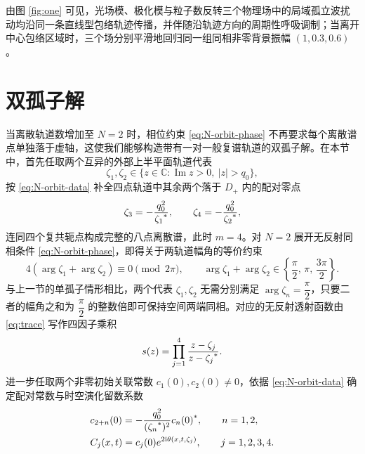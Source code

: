 由图 \ref{fig:one} 可见，光场模、极化模与粒子数反转三个物理场中的局域孤立波扰动均沿同一条直线型包络轨迹传播，并伴随沿轨迹方向的周期性呼吸调制；当离开中心包络区域时，三个场分别平滑地回归同一组同相非零背景振幅 $\left(1,0.3,0.6\right)$。

\section{双孤子解}

当离散轨道数增加至 $N=2$ 时，相位约束 \eqref{eq:N-orbit-phase} 不再要求每个离散谱点单独落于虚轴，这使我们能够构造带有一对一般复谱轨道的双孤子解。在本节中，首先任取两个互异的外部上半平面轨道代表
\begin{equation}\label{eq:two-orbit-reps}
\zeta_1,\zeta_2\in\{z\in\mathbb C:\operatorname{Im}z>0,\ |z|>q_0\},
\end{equation}
按 \eqref{eq:N-orbit-data} 补全四点轨道中其余两个落于 $D_+$ 内的配对零点
\begin{equation}\label{eq:two-orbit-partners}
\zeta_3=-\dfrac{q_0^2}{{\zeta_1}^{*}},\qquad
\zeta_4=-\dfrac{q_0^2}{{\zeta_2}^{*}},
\end{equation}
连同四个复共轭点构成完整的八点离散谱，此时 $m=4$。对 $N=2$ 展开无反射同相条件 \eqref{eq:N-orbit-phase}，即得关于两轨道幅角的等价约束
\begin{equation}\label{eq:two-orbit-phase}
4(\arg\zeta_1+\arg\zeta_2)\equiv0\pmod{2\pi},\qquad
\arg\zeta_1+\arg\zeta_2\in\left\{\dfrac{\pi}{2},\,\pi,\,\dfrac{3\pi}{2}\right\}.
\end{equation}
与上一节的单孤子情形相比，两个代表 $\zeta_1,\zeta_2$ 无需分别满足 $\arg\zeta_n=\dfrac{\pi}{2}$，只要二者的幅角之和为 $\dfrac{\pi}{2}$ 的整数倍即可保持空间两端同相。对应的无反射透射函数由 \eqref{eq:trace} 写作四因子乘积
\begin{equation}\label{eq:two-orbit-s}
s(z)=\prod\limits_{j=1}^{4}\dfrac{z-\zeta_j}{z-{\zeta_j}^{*}}.
\end{equation}
进一步任取两个非零初始关联常数 $c_1(0),c_2(0)\ne0$，依据 \eqref{eq:N-orbit-data} 确定配对常数与时空演化留数系数
\begin{equation}\label{eq:two-orbit-c}
\begin{aligned}
&c_{2+n}(0)=-\dfrac{q_0^2}{({\zeta_n}^{*})^2}{c_n(0)}^{*},\qquad n=1,2,\\
&C_j(x,t)=c_j(0)e^{2\mathrm{i}\theta(x,t,\zeta_j)},\qquad j=1,2,3,4.
\end{aligned}
\end{equation}

